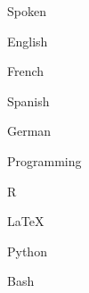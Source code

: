 
\begin{minipage}{0.5\textwidth}
\begin{cvlangs}
	\cvlang
		{Spoken}
		{\item English}
		{\fivestars}
	\cvlang
		{}
		{\item French}
		{\threestars}
	\cvlang
		{}
		{\item Spanish}
		{\threestars}
	\cvlang
		{}
		{\item German}
		{\twostars}
\end{cvlangs}
\end{minipage}
\begin{minipage}{0.5\textwidth}
\begin{cvlangs}
	\cvlang
		{Programming}
		{\item R}
		{\fourstars}
	\cvlang
		{}
		{\item \LaTeX}
		{\fourstars}
	\cvlang
		{}
		{\item Python}
		{\threestars}
	\cvlang
		{}
		{\item Bash}
		{\threestars}
\end{cvlangs}
\end{minipage}
